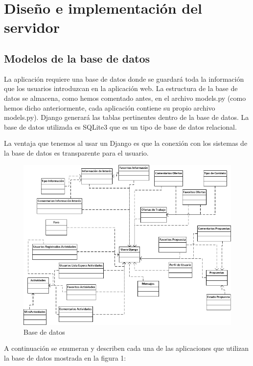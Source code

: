 \section{Diseño e implementación del servidor} 
\label{sec:servidor}


\subsection{Modelos de la base de datos} 
\label{subsec:modelos}


La aplicación requiere una base de datos donde se guardará toda la información que los usuarios introduzcan en la aplicación web. La estructura de la base de datos se almacena, como hemos comentado antes, en el archivo models.py (como hemos dicho anteriormente, cada aplicación contiene su propio archivo models.py). Django generará las tablas pertinentes dentro de la base de datos. La base de datos utilizada es SQLite3 que es un tipo de base de datos relacional.


La ventaja que tenemos al usar un Django es que la conexión con los sistemas de la base de datos es transparente para el usuario. 

 \begin{figure}[H]
    \centering
    \includegraphics[width=12cm]{img/bbdd}
    \caption{Base de datos}
    \label{figura:base_datos}
 \end{figure}


 

A continuación se enumeran y describen cada una de las aplicaciones que utilizan la base de datos mostrada en la figura 1:


